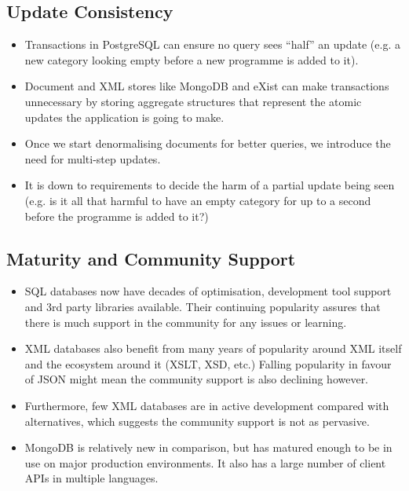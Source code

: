 \documentclass[11pt,a4paper]{article}
\begin{document}
\subsection{Update Consistency}

\begin{itemize}
  \item Transactions in PostgreSQL can ensure no query sees
    ``half'' an update (e.g. a new category looking empty
    before a new programme is added to it).
  \item Document and XML stores like MongoDB and eXist can make
    transactions unnecessary by storing aggregate structures
    that represent the atomic updates the application is going to make.
  \item Once we start denormalising documents for better queries,
    we introduce the need for multi-step updates.
  \item It is down to requirements to decide the harm of a partial
    update being seen (e.g. is it all that harmful to have an empty
    category for up to a second before the programme is added to it?)
\end{itemize}

\subsection{Maturity and Community Support}

\begin{itemize}
  \item SQL databases now have decades of optimisation, development tool
    support and 3rd party libraries available. Their continuing
    popularity assures that there is much support in the community for any
    issues or learning.
  \item XML databases also benefit from many years of popularity around
    XML itself and the ecosystem around it (XSLT, XSD, etc.) Falling popularity
    in favour of JSON might mean the community support is also declining however.
  \item Furthermore, few XML databases are in active development compared
    with alternatives, which suggests the community support is not as
    pervasive.
  \item MongoDB is relatively new in comparison, but has matured enough
    to be in use on major production environments. \cite{mongo-production} It
    also has a large number of client APIs in multiple languages.
\end{itemize}
\end{document}
